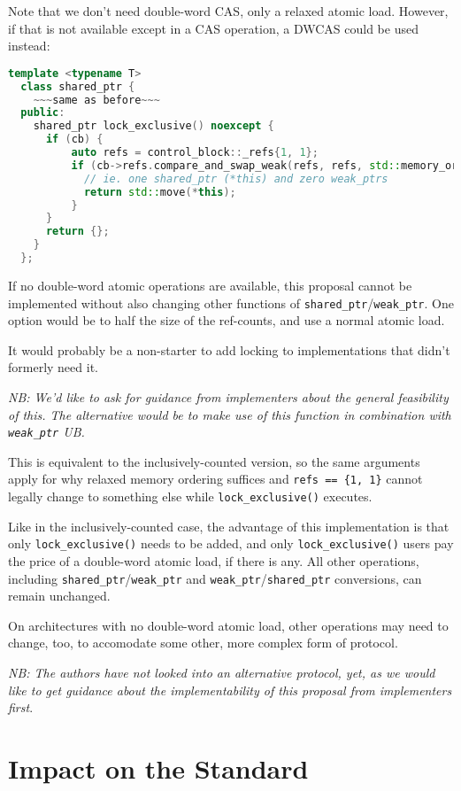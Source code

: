 \documentclass[11pt]{article}
\newcommand{\lockx}{\texttt{lock\_exclusive()}}
\newcommand{\wptr}{\texttt{weak\_ptr}}
\newcommand{\sptr}{\texttt{shared\_ptr}}
\begin{document}
Note that we don't need double-word CAS, only a relaxed atomic load.
However, if that is not available except in a CAS operation, a DWCAS
could be used instead:

\begin{lstlisting}[language=C++,caption={Possible implementation of \lockx{} in an exclusively-counted implementation, using DWCAS}]
  template <typename T>
  class shared_ptr {
    ~~~same as before~~~
  public:
    shared_ptr lock_exclusive() noexcept {
      if (cb) {
          auto refs = control_block::_refs{1, 1};
          if (cb->refs.compare_and_swap_weak(refs, refs, std::memory_order_relaxed)) {
            // ie. one shared_ptr (*this) and zero weak_ptrs
            return std::move(*this);
          }
      }
      return {};
    }
  };
\end{lstlisting}

If no double-word atomic operations are available, this proposal
cannot be implemented without also changing other functions of
\sptr/\wptr. One option would be to half the size of the ref-counts,
and use a normal atomic load.

It would probably be a non-starter to add locking to implementations
that didn't formerly need it.

\emph{NB: We'd like to ask for guidance from implementers about the
  general feasibility of this. The alternative would be to make use of
  this function in combination with \wptr{} UB.}

This is equivalent to the inclusively-counted version, so the same
arguments apply for why relaxed memory ordering suffices and
\texttt{refs == \{1, 1\}} cannot legally change to something else
while \lockx{} executes.

Like in the inclusively-counted case, the advantage of this
implementation is that only \lockx{} needs to be added, and only
\lockx{} users pay the price of a double-word atomic load, if there is
any. All other operations, including \sptr/\wptr{} and \wptr/\sptr{}
conversions, can remain unchanged.

On architectures with no double-word atomic load, other operations may
need to change, too, to accomodate some other, more complex form of
protocol.

\emph{NB: The authors have not looked into an alternative protocol,
  yet, as we would like to get guidance about the implementability of
  this proposal from implementers first}.

\fi

\section{Impact on the Standard}
\end{document}
